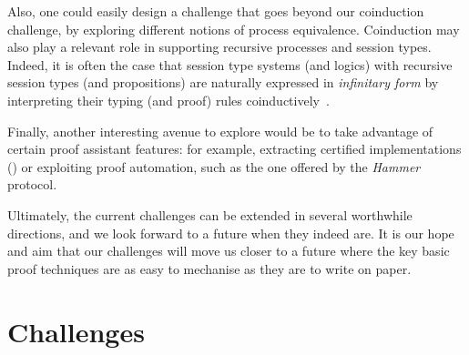 \documentclass[runningheads]{llncs}
\begin{document}
Also, one could easily design a challenge that goes beyond our
coinduction challenge, by exploring different notions of process  equivalence.
%
Coinduction may also play a relevant role in supporting recursive processes and
session types. Indeed, it is often the case that session type systems (and
logics) with recursive session types (and propositions) are naturally expressed
in \emph{infinitary form} by interpreting their typing (and proof) rules
coinductively~\cite{BaeldeDoumaneSaurin16,DerakhshanPfenning22,HornePadovani23}.

Finally, another interesting avenue to explore would be to take
advantage of certain proof assistant features: for example, extracting
certified implementations (\cite{Castro-Perez2021}) or exploiting
proof automation, such as the one offered by the \emph{Hammer}
protocol.

Ultimately, the current challenges can be extended in several worthwhile directions, and we look forward to a future when they indeed are.
It is our hope and aim that our challenges will move us closer to a future where the key basic proof techniques are as easy to mechanise as they are to write on paper.




\clearpage
\appendix
\section{Challenges}\label{app:challenges}

\end{document}
